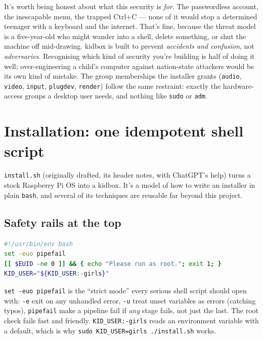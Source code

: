 \documentclass[11pt,oneside]{article}
\newcommand{\code}[1]{\texorpdfstring{\textcolor{kbblue}{\texttt{#1}}}{#1}}
\newcommand{\file}[1]{\textcolor{kbteal}{\texttt{#1}}}
\begin{document}
\begin{deeper}
It's worth being honest about what this security is \emph{for}. The
passwordless account, the inescapable menu, the trapped Ctrl+C --- none of it
would stop a determined teenager with a keyboard and the internet. That's fine,
because the threat model is a five-year-old who might wander into a shell, delete
something, or shut the machine off mid-drawing. kidbox is built to prevent
\emph{accidents and confusion}, not \emph{adversaries}. Recognising which kind of
security you're building is half of doing it well; over-engineering a child's
computer against nation-state attackers would be its own kind of mistake. The
group memberships the installer grants (\texttt{audio}, \texttt{video},
\texttt{input}, \texttt{plugdev}, \texttt{render}) follow the same restraint:
exactly the hardware-access groups a desktop user needs, and nothing like
\texttt{sudo} or \texttt{adm}.
\end{deeper}

\section{Installation: one idempotent shell script}

\file{install.sh} (originally drafted, its header notes, with ChatGPT's help)
turns a stock Raspberry Pi OS into a kidbox. It's a model of how to write an
installer in plain \texttt{bash}, and several of its techniques are reusable far
beyond this project.

\subsection{Safety rails at the top}

\begin{lstlisting}[language=bash]
#!/usr/bin/env bash
set -euo pipefail
[[ $EUID -ne 0 ]] && { echo "Please run as root."; exit 1; }
KID_USER="${KID_USER:-girls}"
\end{lstlisting}

\code{set -euo pipefail} is the ``strict mode'' every serious shell script
should open with: \code{-e} exit on any unhandled error, \code{-u} treat unset
variables as errors (catching typos), \code{pipefail} make a pipeline fail if
\emph{any} stage fails, not just the last. The root check fails fast and
friendly. \code{KID\_USER:-girls} reads an environment variable with a default,
which is why \code{sudo KID\_USER=girls ./install.sh} works.
\end{document}
